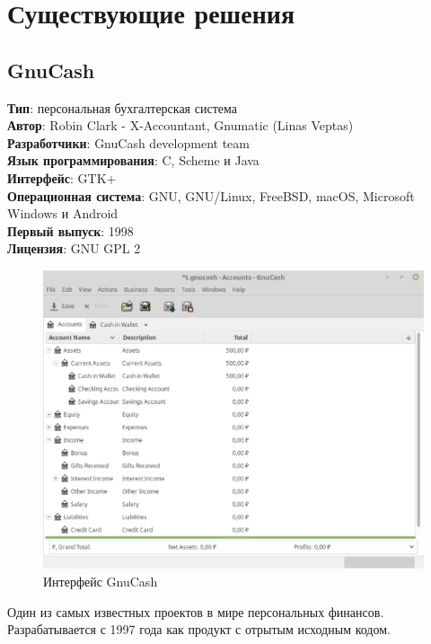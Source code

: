 \section{Существующие решения}
\subsection*{GnuCash}

\textbf{Тип}: персональная бухгалтерская система\\
\textbf{Автор}: Robin Clark - X-Accountant,
Gnumatic (Linas Veptas)\\
\textbf{Разработчики}: GnuCash development team\\
\textbf{Язык программирования}: C, Scheme и Java\\
\textbf{Интерфейс}: 	GTK+\\
\textbf{Операционная система}: GNU, GNU/Linux, FreeBSD, macOS, Microsoft Windows и Android\\
\textbf{Первый выпуск}: 1998\\
\textbf{Лицензия}: 	GNU GPL 2\\

\begin{figure}[H]
	\centering
	\includegraphics[width=1\linewidth]{pics/GnuCash.eps}
	\caption{Интерфейс GnuCash}
	\label{fig:GnuCash}
\end{figure}

Один из самых известных проектов в мире персональных финансов. Разрабатывается с 1997 года как продукт с отрытым исходным кодом.\\

